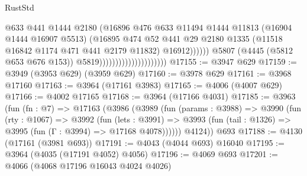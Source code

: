 \begin{lexlean}{RustStd}
\begin{coremodule}
                                                      @633
                                                      @441
                                                      @1444
                                                      @2180
                                                      (@16896
                                                        @476
                                                        @633
                                                        @11494
                                                        @1444
                                                        @11813
                                                        (@16904 @1444 @16907 @5513)
                                                        (@16895
                                                          @474
                                                          @52
                                                          @441
                                                          @29
                                                          @2180
                                                          @1335
                                                          (@11518
                                                            @16842
                                                            @1174
                                                            @471
                                                            @441
                                                            @2179
                                                            @11832)
                                                          @16912))))))
                                              @5807
                                              (@4445 (@5812 @653 @676 @153))
                                              @5819)))))))))))))))))))))
@17155 := @3947 @629
@17159 := @3949 (@3953 @629) (@3959 @629)
@17160 := @3978 @629
@17161 := @3968 @17160
@17163 := @3964 (@17161 @3983)
@17165 := @4006 (@4007 @629)
@17166 := @4002 @17165
@17168 := @3964 (@17166 @4031)
@17185 := @3963
    (fun (fn : @7) =>
    @17163
      (@3986
        (@3989
          (fun (params : @3988) =>
          @3990
            (fun (rty : @1067) =>
            @3992
              (fun (lets : @3991) =>
              @3993 (fun (tail : @1326) => @3995 (fun (Γ : @3994) => @17168 @4078))))))
        @4124))
    @693
@17188 := @4130 (@17161 (@3981 @693))
@17191 := @4043 (@4044 @693) @16040
@17195 := @3964 (@4035 (@17191 @4052) @4056)
@17196 := @4069 @693
@17201 := @4066 (@4068 @17196 @16043 @4024 @4026)

\end{coremodule}
\end{lexlean}
